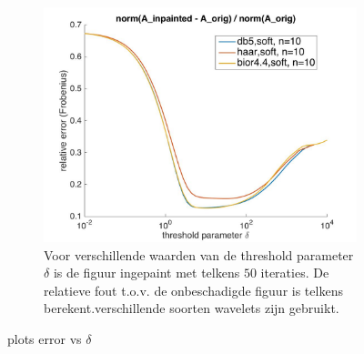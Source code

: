 \begin{figure}
\begin{subfigure}[b]{0.7\textwidth}
        \includegraphics[width=\textwidth]{../src/inpainting/paint_letter_wavekinds_soft_it50}
        \caption{Voor verschillende waarden van de threshold parameter $\delta$ is de figuur ingepaint met telkens $50$ iteraties. De relatieve fout t.o.v. de onbeschadigde figuur is telkens berekent.verschillende soorten wavelets zijn gebruikt.}
        \label{fig:mouse}
    \end{subfigure}
    \caption{plots error vs $\delta$}\label{fig:baboon}
\end{figure}


